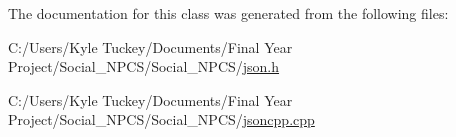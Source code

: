 The documentation for this class was generated from the following files\+:\begin{DoxyCompactItemize}
\item 
C\+:/\+Users/\+Kyle Tuckey/\+Documents/\+Final Year Project/\+Social\+\_\+\+N\+P\+C\+S/\+Social\+\_\+\+N\+P\+C\+S/\hyperlink{json_8h}{json.\+h}\item 
C\+:/\+Users/\+Kyle Tuckey/\+Documents/\+Final Year Project/\+Social\+\_\+\+N\+P\+C\+S/\+Social\+\_\+\+N\+P\+C\+S/\hyperlink{jsoncpp_8cpp}{jsoncpp.\+cpp}\end{DoxyCompactItemize}
